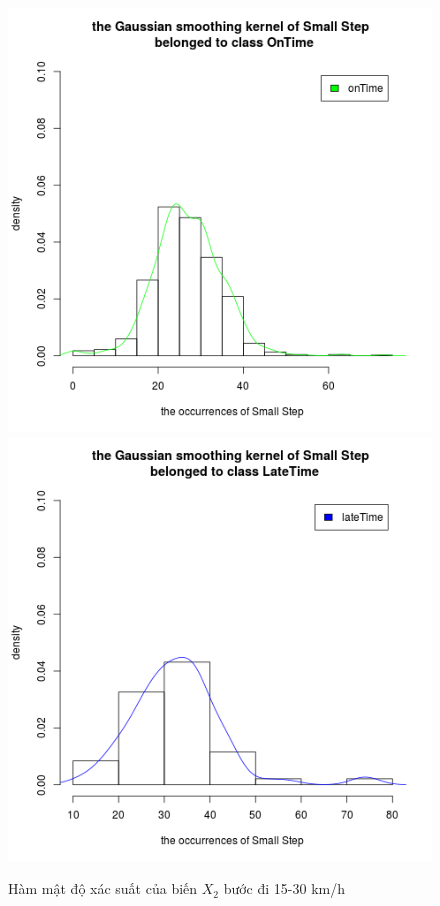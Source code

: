\documentclass[a4paper, 13pt]{report}
\begin{document}
\begin{figure}[!htb]
  \includegraphics[width=\linewidth]{DensitySmallStep_OnTime}
\endminipage
{}
  \includegraphics[width=\linewidth]{DensitySmallStep_LateTime}
\endminipage
\caption*{Hàm mật độ xác suất của biến $X_2$ bước đi 15-30 km/h}
\end{figure}
\end{document}
